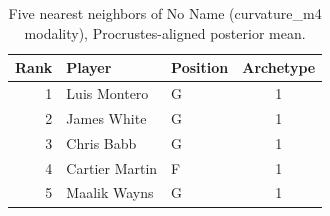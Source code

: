 \begin{table}[htbp]
  \centering\small
  \begin{tabular}{rllc}
    \toprule
    Rank & Player & Position & Archetype \\
    \midrule
    1 & Luis Montero & G & 1 \\
    2 & James White & G & 1 \\
    3 & Chris Babb & G & 1 \\
    4 & Cartier Martin & F & 1 \\
    5 & Maalik Wayns & G & 1 \\
    \bottomrule
  \end{tabular}
  \caption{Five nearest neighbors of No Name (curvature_m4 modality), Procrustes-aligned posterior mean.}
  \label{tab:No_Name_neighbors_curvature_m4}
\end{table}

